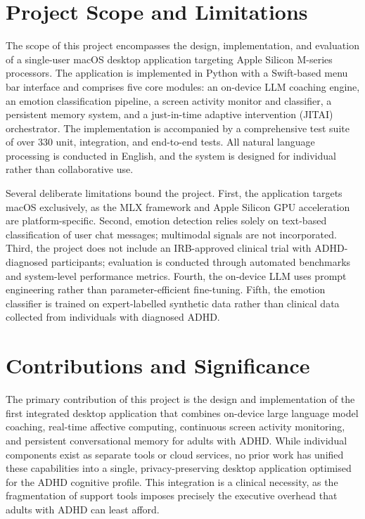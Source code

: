 \section{Project Scope and Limitations}
\label{sec:scope}

The scope of this project encompasses the design, implementation, and evaluation of a single-user macOS desktop application targeting Apple Silicon M-series processors. The application is implemented in Python with a Swift-based menu bar interface and comprises five core modules: an on-device LLM coaching engine, an emotion classification pipeline, a screen activity monitor and classifier, a persistent memory system, and a just-in-time adaptive intervention (JITAI) orchestrator. The implementation is accompanied by a comprehensive test suite of over 330 unit, integration, and end-to-end tests. All natural language processing is conducted in English, and the system is designed for individual rather than collaborative use.

Several deliberate limitations bound the project. First, the application targets macOS exclusively, as the MLX framework and Apple Silicon GPU acceleration are platform-specific. Second, emotion detection relies solely on text-based classification of user chat messages; multimodal signals are not incorporated. Third, the project does not include an IRB-approved clinical trial with ADHD-diagnosed participants; evaluation is conducted through automated benchmarks and system-level performance metrics. Fourth, the on-device LLM uses prompt engineering rather than parameter-efficient fine-tuning. Fifth, the emotion classifier is trained on expert-labelled synthetic data rather than clinical data collected from individuals with diagnosed ADHD.

\section{Contributions and Significance}
\label{sec:contributions}

The primary contribution of this project is the design and implementation of the first integrated desktop application that combines on-device large language model coaching, real-time affective computing, continuous screen activity monitoring, and persistent conversational memory for adults with ADHD. While individual components exist as separate tools or cloud services, no prior work has unified these capabilities into a single, privacy-preserving desktop application optimised for the ADHD cognitive profile. This integration is a clinical necessity, as the fragmentation of support tools imposes precisely the executive overhead that adults with ADHD can least afford.

